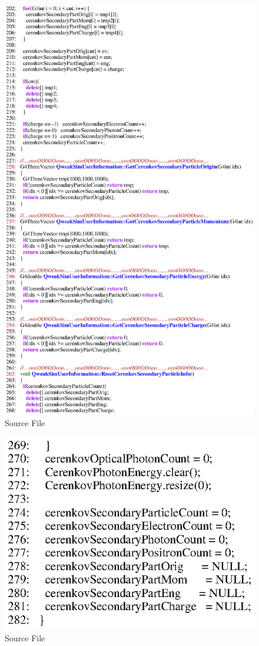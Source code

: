 \begin{figure}[h]
  \hspace{0cm}
  \includegraphics[scale=0.8]{./figures18/QweakSimUserInformation.cc-p4.eps}
  \caption{\label{SourceXVIII6} Source File}
           \label{fig:XVIII-SC-6}
\end{figure}
\clearpage

\begin{figure}[h]
  \hspace{0cm}
  \includegraphics[scale=0.8]{./figures18/QweakSimUserInformation.cc-p5.eps}
  \caption{\label{SourceXVIII7} Source File}
           \label{fig:XVIII-SC-7}
\end{figure}
\clearpage
